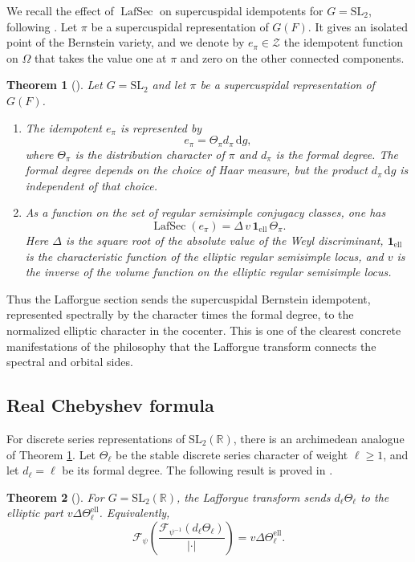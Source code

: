 \documentclass[iccmp]{ipbook}
\newcommand{\BR}{{\mathbb {R}}}
\newcommand{\CF}{{\mathcal {F}}}
\newcommand{\CZ}{{\mathcal {Z}}}
\newcommand{\el}{{\mathrm{ell}}}
\newcommand{\SL}{{\mathrm{SL}}}
\newcommand{\ud}{\,\mathrm{d}}
\def\Ome{{\Omega}}
\newcommand{\LafSec}{\operatorname{LafSec}}
\newtheorem{thm}{Theorem}[subsection]
\begin{document}
We recall the effect of $\LafSec$ on supercuspidal idempotents for $G=\SL_2$, following
\cite[\S 5.2]{LN}. Let $\pi$ be a supercuspidal representation of $G(F)$. It gives an
isolated point of the Bernstein variety, and we denote by $e_\pi\in \CZ$ the idempotent
function on $\Ome$ that takes the value one at $\pi$ and zero on the other connected
components.

\begin{thm}[{\cite[Thm.~5.2.1]{LN}}]\label{thm:Laf-supercuspidal}
Let $G=\SL_2$ and let $\pi$ be a supercuspidal representation of $G(F)$.
\begin{enumerate}
\item The idempotent $e_\pi$ is represented by
\[
e_\pi=\Theta_\pi d_\pi\ud g,
\]
where $\Theta_\pi$ is the distribution character of $\pi$ and $d_\pi$ is the formal degree.
The formal degree depends on the choice of Haar measure, but the product $d_\pi\ud g$ is
independent of that choice.

\item As a function on the set of regular semisimple conjugacy classes, one has
\[
\LafSec(e_\pi)=\Delta\,v\,\mathbf{1}_{\el}\,\Theta_\pi.
\]
Here $\Delta$ is the square root of the absolute value of the Weyl discriminant,
$\mathbf{1}_{\el}$ is the characteristic function of the elliptic regular semisimple locus,
and $v$ is the inverse of the volume function on the elliptic regular semisimple locus.
\end{enumerate}
\end{thm}

Thus the Lafforgue section sends the supercuspidal Bernstein idempotent, represented
spectrally by the character times the formal degree, to the normalized elliptic character
in the cocenter. This is one of the clearest concrete manifestations of the philosophy that
the Lafforgue transform connects the spectral and orbital sides.

\subsection{Real Chebyshev formula}\label{subsec:Laf-Chebyshev}

For discrete series representations of $\SL_2(\BR)$, there is an archimedean analogue of
Theorem \ref{thm:Laf-supercuspidal}. Let $\Theta_\ell$ be the stable discrete series
character of weight $\ell\geq 1$, and let $d_\ell=\ell$ be its formal degree. The following
result is proved in \cite[\S 5.3]{LN}.

\begin{thm}[{\cite[Thm.~5.3.1]{LN}}]\label{thm:Laf-Chebyshev}
For $G=\SL_2(\BR)$, the Lafforgue transform sends $d_\ell\Theta_\ell$ to the elliptic part
$v\Delta\Theta_\ell^{\el}$. Equivalently,
\begin{equation}\label{eq:Laf-Chebyshev}
\CF_\psi\left(
\frac{\CF_{\psi^{-1}}(d_\ell\Theta_\ell)}{|\cdot|}
\right)
=
v\Delta\Theta_\ell^{\el}.
\end{equation}
\end{thm}
\end{document}
